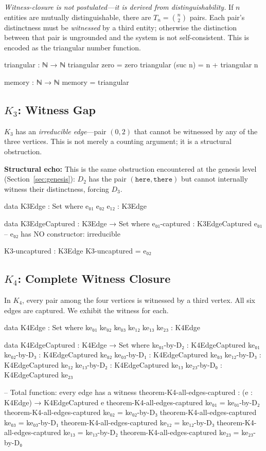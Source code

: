 \documentclass[11pt,a4paper]{article}
\begin{document}
\emph{Witness-closure is not postulated---it is derived from
distinguishability.} If $n$ entities are mutually distinguishable,
there are $T_n = \binom{n}{2}$ pairs. Each pair's distinctness must be
\emph{witnessed} by a third entity; otherwise the distinction between
that pair is ungrounded and the system is not self-consistent.
This is encoded as the triangular number function.

\begin{code}
triangular : ℕ → ℕ
triangular zero    = zero
triangular (suc n) = n + triangular n

memory : ℕ → ℕ
memory = triangular
\end{code}

\subsection{$K_3$: Witness Gap}

$K_3$ has an \emph{irreducible edge}---pair $(0,2)$ that cannot be
witnessed by any of the three vertices. This is not merely a counting
argument; it is a structural obstruction.

\noindent\textbf{Structural echo:} This is the same obstruction encountered
at the genesis level (Section~\ref{sec:genesis}): $D_2$ has the pair
$(\texttt{here}, \texttt{there})$ but cannot internally witness their distinctness,
forcing $D_3$.

\begin{code}
data K3Edge : Set where
  e₀₁ e₀₂ e₁₂ : K3Edge

data K3EdgeCaptured : K3Edge → Set where
  e₀₁-captured : K3EdgeCaptured e₀₁
  -- e₀₂ has NO constructor: irreducible

K3-uncaptured : K3Edge
K3-uncaptured = e₀₂
\end{code}

\subsection{$K_4$: Complete Witness Closure}

In $K_4$, every pair among the four vertices is witnessed by a third
vertex. All six edges are captured. We exhibit the witness for each.

\begin{code}
data K4Edge : Set where
  ke₀₁ ke₀₂ ke₀₃ ke₁₂ ke₁₃ ke₂₃ : K4Edge

data K4EdgeCaptured : K4Edge → Set where
  ke₀₁-by-D₂ : K4EdgeCaptured ke₀₁
  ke₀₂-by-D₃ : K4EdgeCaptured ke₀₂
  ke₀₃-by-D₁ : K4EdgeCaptured ke₀₃
  ke₁₂-by-D₃ : K4EdgeCaptured ke₁₂
  ke₁₃-by-D₂ : K4EdgeCaptured ke₁₃
  ke₂₃-by-D₀ : K4EdgeCaptured ke₂₃

-- Total function: every edge has a witness
theorem-K4-all-edges-captured : (e : K4Edge) → K4EdgeCaptured e
theorem-K4-all-edges-captured ke₀₁ = ke₀₁-by-D₂
theorem-K4-all-edges-captured ke₀₂ = ke₀₂-by-D₃
theorem-K4-all-edges-captured ke₀₃ = ke₀₃-by-D₁
theorem-K4-all-edges-captured ke₁₂ = ke₁₂-by-D₃
theorem-K4-all-edges-captured ke₁₃ = ke₁₃-by-D₂
theorem-K4-all-edges-captured ke₂₃ = ke₂₃-by-D₀
\end{code}
\end{document}
